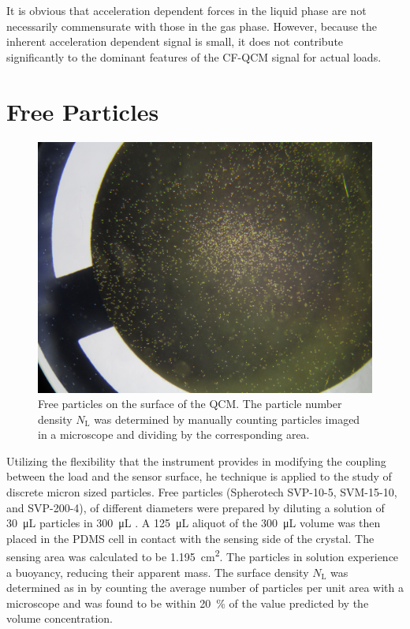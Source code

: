 It is obvious that acceleration dependent forces in the liquid
phase are not necessarily commensurate with those in the gas phase.
However, because the inherent acceleration dependent signal is small, it
does not contribute significantly to the dominant features of the CF-QCM
signal for actual loads.

\section{Free Particles}
\begin{figure}
\centering
\includegraphics[keepaspectratio,width=12cm]{qcm/figures/qcm_beadssurface.jpg}
\caption{Free particles on the surface of the QCM.  The particle number
				density $N_\mathrm{L}$ was determined by manually counting
				particles imaged in a microscope and dividing by the corresponding area.}
\label{fig:countparticles}
\end{figure}
Utilizing the flexibility that the instrument provides in modifying the
coupling between the load and the sensor surface, he technique is applied 
to the study of discrete micron sized particles.  
Free particles (Spherotech SVP-10-5, SVM-15-10, and SVP-200-4), of
different diameters were prepared by diluting a solution of
\SI{30}{\micro\liter} particles in \SI{300}{\micro\liter} .  A
\SI{125}{\micro\liter} aliquot of the \SI{300}{\micro\liter} volume was
then placed in the PDMS cell in contact with the sensing side of the
crystal.  The sensing area was calculated to be
\SI{1.195}{\centi\meter\squared}.  The particles in solution experience a
buoyancy, reducing their apparent mass. The surface density
$N_\mathrm{L}$ was determined as in  by counting the average number of particles
per unit area with a microscope and was found to be within
\SI{20}{\percent} of the value predicted by the volume concentration.

